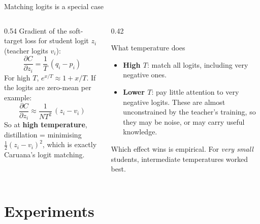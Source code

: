 \documentclass[aspectratio=169,11pt]{beamer}
\begin{document}
\begin{frame}{Matching logits is a special case}
  \begin{columns}[T]
    \begin{column}{0.54\textwidth}
      \small
      Gradient of the soft-target loss for student logit $z_i$ (teacher logits $v_i$):
      \[
        \frac{\partial C}{\partial z_i}=\frac1T\,(q_i-p_i)
      \]
      For high $T$, $e^{x/T}\approx1+x/T$. If the logits are zero-mean per example:
      \[
        \frac{\partial C}{\partial z_i}\approx\frac{1}{NT^2}\,(z_i-v_i)
      \]
      So at \textbf{high temperature}, distillation = minimising $\tfrac12(z_i-v_i)^2$, which is exactly Caruana's logit matching.
    \end{column}
    \begin{column}{0.42\textwidth}
      \begin{block}{What temperature does}
        \small
        \begin{itemize}
          \item \textbf{High $T$}: match all logits, including very negative ones.
          \item \textbf{Lower $T$}: pay little attention to very negative logits. These are almost unconstrained by the teacher's training, so they may be noise, or may carry useful knowledge.
        \end{itemize}
        Which effect wins is empirical. For \emph{very small} students, intermediate temperatures worked best.
      \end{block}
    \end{column}
  \end{columns}
\end{frame}

\section{Experiments}
\end{document}
